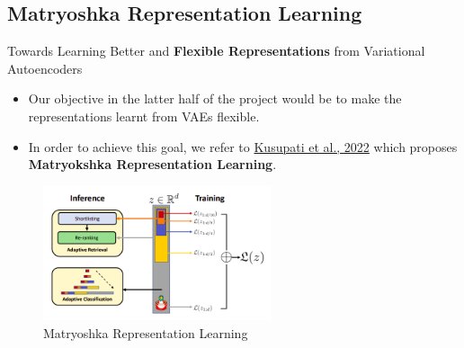 \documentclass[hyperref={colorlinks,citecolor=blue,linkcolor=blue,urlcolor=blue}]{beamer}
\begin{document}
\subsection{Matryoshka Representation Learning}

\begin{frame}{ Towards Learning Better and \textbf{Flexible Representations} from Variational Autoencoders \vspace{0.3em}}
  \begin{itemize}
    \item Our objective in the latter half of the project would be to make the representations learnt from VAEs flexible.
    \item In order to achieve this goal, we refer to \href{https://proceedings.neurips.cc/paper_files/paper/2022/file/c32319f4868da7613d78af9993100e42-Paper-Conference.pdf}{Kusupati et al., 2022} which proposes \textbf{Matryokshka Representation Learning}.
  \end{itemize}
  \pause
  \begin{center}
    \begin{figure}
      \includegraphics[width=0.6\textwidth]{./Images/mrl.png}
      \caption{Matryoshka Representation Learning}
    \end{figure}
  \end{center}
\end{frame}
\end{document}
